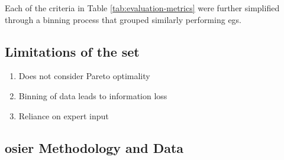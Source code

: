 
Each of the criteria in Table \ref{tab:evaluation-metrics} were further simplified through a binning process that grouped similarly performing \acp{eg}.

\subsection{Limitations of the \ac{set}}
\begin{enumerate}
    \item Does not consider Pareto optimality
    \item Binning of data leads to information loss
    \item Reliance on expert input
\end{enumerate}

\subsection{\ac{osier} Methodology and Data}

